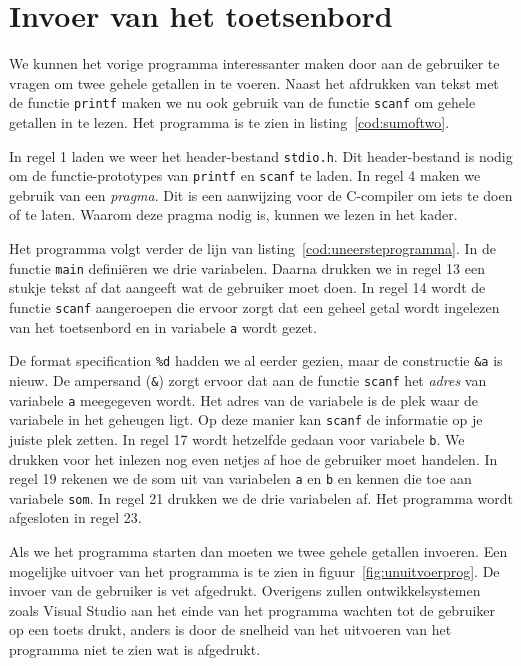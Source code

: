 \section{Invoer van het toetsenbord}
We kunnen het vorige programma interessanter maken door aan de gebruiker te vragen om twee gehele getallen in te voeren. Naast het afdrukken van tekst met de functie \texttt{printf} maken we nu ook gebruik van de functie \texttt{scanf} om gehele getallen in te lezen. Het programma is te zien in listing~\ref{cod:sumoftwo}.


In regel 1 laden we weer het header-bestand \texttt{stdio.h}. Dit header-bestand is nodig om de functie-prototypes van \texttt{printf} en \texttt{scanf} te laden. In regel 4 maken we gebruik van een \textsl{pragma}. Dit is een aanwijzing voor de C-compiler om iets te doen of te laten. Waarom deze pragma nodig is, kunnen we lezen in het kader.%

Het programma volgt verder de lijn van listing~\ref{cod:uneersteprogramma}. In de functie \texttt{main} definiëren we drie variabelen. Daarna drukken we in regel 13 een stukje tekst af dat aangeeft wat de gebruiker moet doen. In regel 14 wordt de functie \texttt{scanf} aangeroepen die ervoor zorgt dat een geheel getal wordt ingelezen van het toetsenbord en in variabele \texttt{a} wordt gezet.

De format specification \texttt{\%d} hadden we al eerder gezien, maar de constructie \texttt{\&a} is nieuw. De ampersand (\texttt{\&}) zorgt ervoor dat aan de functie \texttt{scanf} het \textsl{adres} van variabele \texttt{a} meegegeven wordt. Het adres van de variabele is de plek waar de variabele in het geheugen ligt. Op deze manier kan \texttt{scanf} de informatie op je juiste plek zetten. In regel 17 wordt hetzelfde gedaan voor variabele \texttt{b}. We drukken voor het inlezen nog even netjes af hoe de gebruiker moet handelen. In regel 19 rekenen we de som uit van variabelen \texttt{a} en \texttt{b} en kennen die toe aan variabele \texttt{som}. In regel 21 drukken we de drie variabelen af. Het programma wordt afgesloten in regel 23.

Als we het programma starten dan moeten we twee gehele getallen invoeren. Een mogelijke uitvoer van het programma is te zien in figuur~\ref{fig:unuitvoerprog}. De invoer van de gebruiker is vet afgedrukt.
Overigens zullen ontwikkelsystemen zoals Visual Studio aan het einde van het programma wachten tot de gebruiker op een toets drukt, anders is door de snelheid van het uitvoeren van het programma niet te zien wat is afgedrukt.

